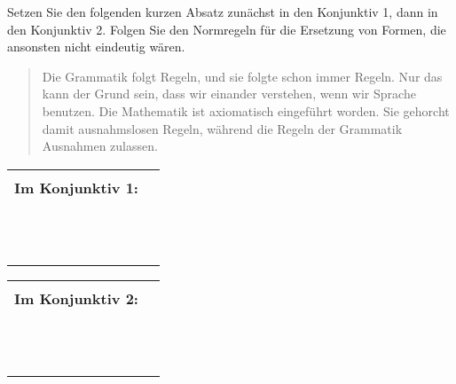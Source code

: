 \documentclass[12pt,a4paper,twoside]{article}
\begin{document}
\begin{ignorable}
Setzen Sie den folgenden kurzen Absatz zunächst in den Konjunktiv 1, dann in den Konjunktiv 2.
Folgen Sie den Normregeln für die Ersetzung von Formen, die ansonsten nicht eindeutig wären.

\begin{quote}
  Die Grammatik folgt Regeln, und sie folgte schon immer Regeln.
  Nur das kann der Grund sein, dass wir einander verstehen, wenn wir Sprache benutzen.
  Die Mathematik ist axiomatisch eingeführt worden.
  Sie gehorcht damit ausnahmslosen Regeln, während die Regeln der Grammatik Ausnahmen zulassen.
\end{quote}


\begin{center}
  \begin{tabular}[h]{cp{}}
  &\\
  \textbf{Im Konjunktiv 1:} &\\\cline{2-2}
  &\\
  &\\\hline
  &\\
  &\\\hline
  &\\
  &\\\hline
  &\\
  &\\\hline
  &\\
  &\\\hline
  &\\
  &\\\hline
  \end{tabular}
\end{center}

\begin{center}
  \begin{tabular}[h]{cp{}}
  &\\
  \textbf{Im Konjunktiv 2:} &\\\cline{2-2}
  &\\
  &\\\hline
  &\\
  &\\\hline
  &\\
  &\\\hline
  &\\
  &\\\hline
  &\\
  &\\\hline
  &\\
  &\\\hline
  \end{tabular}
\end{center}


\end{ignorable}
\end{document}
